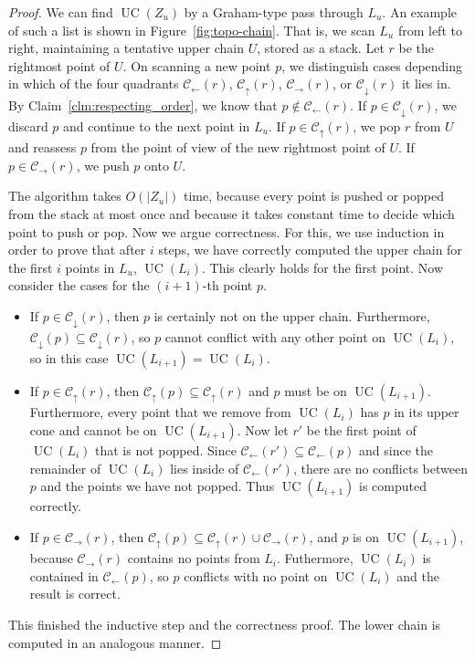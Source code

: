 \documentclass[11pt]{paper}
\DeclareMathOperator {\UC}{UC}
\begin{document}
\begin{proof}
We can find $\UC(Z_u)$ by a Graham-type pass through $L_u$.
An example of such a list is shown in Figure~\ref {fig:topo-chain}.
That is, we scan $L_u$ from left to right, 
maintaining
a tentative upper chain $U$, stored as a stack. 
Let $r$ be the rightmost point of $U$.
On scanning a new point $p$, we distinguish cases depending
in which of the four quadrants
$\mathcal{C}_\leftarrow(r)$, $\mathcal{C}_\uparrow(r)$, 
$\mathcal{C}_\rightarrow(r)$, or $\mathcal{C}_\downarrow(r)$
it lies in.
By Claim~\ref {clm:respecting_order}, we know that 
$p \notin \mathcal{C}_\leftarrow(r)$. 
If $p \in \mathcal{C}_\downarrow(r)$, we discard $p$ and continue to
the next point in $L_u$. 
If $p \in \mathcal{C}_\uparrow(r)$, we
pop $r$ from $U$ and reassess $p$ from the point of view of the
new rightmost point of $U$.
If $p \in \mathcal{C}_\rightarrow(r)$, we push $p$ onto $U$.

The algorithm takes $O(|Z_u|)$ time, because every point is pushed
or popped from the stack at most once and because it takes constant
time to decide which point to push or pop.
Now we argue correctness. For this, we use induction in order to
prove that after $i$ steps, we have correctly computed the
upper chain for the first $i$ points in $L_u$, $\UC(L_i)$. This clearly
holds for the first point. Now consider the cases for the $(i+1)$-th
point $p$. 
\begin{itemize}
\item
If $p \in \mathcal{C}_\downarrow(r)$, then $p$ is certainly
not on the upper chain. Furthermore, 
$\mathcal{C}_\downarrow(p) \subseteq \mathcal{C}_\downarrow(r)$,
so $p$ cannot conflict with any other point on $\UC(L_i)$,
so in this case $\UC(L_{i+1}) = \UC(L_i)$.
\item
If $p \in \mathcal{C}_\uparrow(r)$, then 
$\mathcal{C}_\uparrow(p) \subseteq \mathcal{C}_\uparrow(r)$ and $p$
must be on $\UC(L_{i+1})$. Furthermore, every point that we remove
from $\UC(L_i)$ has $p$ in its upper cone and cannot be on
$\UC(L_{i+1})$. Now let $r'$ be the first point of $\UC(L_i)$ that
is not popped. Since 
$\mathcal{C}_\leftarrow(r') \subseteq \mathcal{C}_\leftarrow(p)$ and since
the remainder of $\UC(L_i)$ lies inside of 
$\mathcal{C}_\leftarrow(r')$, there are no conflicts between $p$ and the
points we have not popped. Thus $\UC(L_{i+1})$ is computed correctly.
\item If $p \in \mathcal{C}_\rightarrow(r)$, then 
$\mathcal{C}_\uparrow(p) \subseteq \mathcal{C}_\uparrow(r) \cup
\mathcal{C}_\rightarrow(r)$, and $p$ is on $\UC(L_{i+1})$, because
$\mathcal{C}_\rightarrow(r)$ contains no points from $L_i$.
Futhermore, $\UC(L_i)$ is contained in $\mathcal{C}_\leftarrow(p)$,
so $p$ conflicts with no point on $\UC(L_i)$ and the result is correct.
\end{itemize}
This finished the inductive step and the correctness proof.
The lower chain is computed in an analogous manner.
\end{proof}
\end{document}

